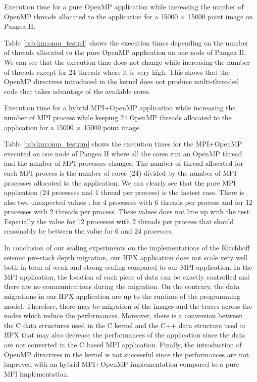 \begin{table}[H]
	\centering
	
	\caption{Execution time for a pure OpenMP application while increasing the number of OpenMP threads allocated to the application for a 15000 $\times$ 15000 point image on Pangea II. \label{tab:km:omp_testp1}}
\end{table}

Table \ref{tab:km:omp_testp1} shows the execution times depending on the number of threads allocated to the pure OpenMP application on one node of Pangea II.
We can see that the execution time does not change while increasing the number of threads except for 24 threads where it is very high.
This shows that the OpenMP directives introduced in the kernel does not produce multi-threaded code that takes advantage of the available cores.

\begin{table}[H]
	\centering
	
	\caption{Execution time for a hybrid MPI+OpenMP application while increasing the number of MPI process while keeping 24 OpenMP threads allocated to the application for a 15000 $\times$ 15000 point image. \label{tab:km:omp_testpm}}
\end{table}

Table \ref{tab:km:omp_testpm} shows the execution times for the MPI+OpenMP executed on one node of Pangea II where all the cores run an OpenMP thread and the number of MPI processes changes.
The number of thread allocated for each MPI process is the number of cores (24) divided by the number of MPI processes allocated to the application.
We can clearly see that the pure MPI application (24 processes and 1 thread per process) is the fastest case.
There is also two unexpected values ; for 4 processes with 6 threads per process and for 12 processes with 2 threads per process.
These values does not line up with the rest.
Especially the value for 12 processes with 2 threads per process that should reasonably be between the value for 6 and 24 processes.

In conclusion of our scaling experiments on the implementations of the Kirchhoff seismic pre-stack depth migration, our HPX application does not scale very well both in term of weak and strong scaling compared to our MPI application.
In the MPI application, the location of each piece of data can be exactly controlled and there are no communications during the migration.
On the contrary, the data migrations in our HPX application are up to the runtime of the programming model.
Therefore, there may be migration of the images and the traces across the nodes which reduce the performances.
Moreover, there is a conversion between the C data structures used in the C kernel and the C++ data structure used in HPX that may also decrease the performances of the application since the data are not converted in the C based MPI application.
Finally, the introduction of OpenMP directives in the kernel is not successful since the performances are not improved with an hybrid MPI+OpenMP implementation compared to a pure MPI implementation.

